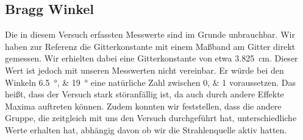 \subsection{Bragg Winkel}
Die in diesem Versuch erfassten Messwerte sind im Grunde unbrauchbar. Wir haben zur Referenz die Gitterkonstante mit einem Maßband am Gitter direkt gemessen. Wir erhielten dabei eine Gitterkonstante von etwa \SI{3.825}{\centi\meter}. Dieser Wert ist jedoch mit unseren Messwerten nicht vereinbar. Er würde bei den Winkeln \SIlist{6.5;19}{\degree} eine natürliche Zahl zwischen \numlist{0;1} voraussetzen. Das heißt, dass der Versuch stark störanfällig ist, da auch durch andere Effekte Maxima auftreten können. Zudem konnten wir feststellen, dass die andere Gruppe, die zeitgleich mit uns den Versuch durchgeführt hat, unterschiedliche Werte erhalten hat, abhängig davon ob wir die Strahlenquelle aktiv hatten.